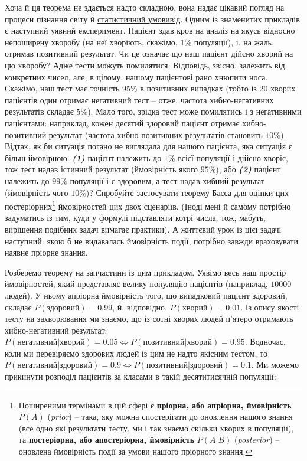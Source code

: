 \documentclass[
  11pt,
]{book}
\begin{document}
Хоча й ця теорема не здається надто складною, вона надає цікавий погляд на процеси пізнання світу й \hyperref[paradigms]{статистичний умовивід}. Одним із знаменитих прикладів є наступний уявний експеримент. Пацієнт здав кров на аналіз на якусь відносно непоширену хворобу (на неї хворіють, скажімо, \(1\%\) популяції), і, на жаль, отримав позитивний результат. Чи це означає що наш пацієнт дійсно хворий на цю хворобу? Адже тести можуть помилятися. Відповідь, звісно, залежить від конкретних чисел, але, в цілому, нашому пацієнтові рано хнюпити носа. Скажімо, наш тест має точність \(95\%\) в позитивних випадках (тобто із \(20\) хворих пацієнтів один отримає негативний тест -- отже, частота хибно-негативних результатів складає \(5\%\)). Мало того, зрідка тест може помилятись і з негативними пацієнтами: наприклад, кожен десятий здоровий пацієнт отримає хибно-позитивний результат (частота хибно-позитивних результатів становить \(10\%\)). Відтак, як би ситуація погано не виглядала для нашого пацієнта, яка ситуація є більш ймовірною: \textbf{\emph{(1)}} пацієнт належить до \(1\%\) всієї популяції і дійсно хворіє, тож тест надав істинний результат (ймовірність якого \(95\%\)), або \textbf{\emph{(2)}} пацієнт належить до \(99\%\) популяції і є здоровим, а тест надав хибний результат (ймовірність чого \(10\%\))? Спробуйте застосувати теорему Баєса для оцінки цих постеріорних\footnote{Поширеними термінами в цій сфері є \textbf{пріорна, або апріорна, ймовірність} \(P(A)\) (\emph{prior}) -- така, яку можна спостерігати до оновлення нашого знання (все одно які результати тесту, ми і так знаємо скільки хворих в популяції), та \textbf{постеріорна, або апостеріорна, ймовірність} \(P(A|B)\) (\emph{posterior}) -- оновлена ймовірність події за умови нашого пріорного знання.} ймовірностей цих двох сценаріїв. (Іноді мені й самому потрібно задуматись із тим, куди у формулі підставляти котрі числа, тож, мабуть, вирішення подібних задач вимагає практики). А життєвий урок із цієї задачі наступний: якою б не видавалась ймовірність події, потрібно завжди враховувати наявне пріорне знання.

Розберемо теорему на запчастини із цим прикладом. Уявімо весь наш простір ймовірностей, який представляє велику популяцію пацієнтів (наприклад, \(10000\) людей). У ньому апріорна ймовірність того, що випадковий пацієнт здоровий, складає \(P(\text{здоровий}) = 0.99\), й, відповідно, \(P(\text{хворий}) = 0.01\). Із опису якості тесту на захворювання ми знаємо, що із сотні хворих людей п'ятеро отримають хибно-негативний результат: \(P(\text{негативний|хворий}) = 0.05 \Leftrightarrow P(\text{позитивний|хворий}) = 0.95\). Водночас, коли ми перевіряємо здорових людей із цим не надто якісним тестом, то \(P(\text{негативний|здоровий}) = 0.9 \Leftrightarrow P(\text{позитивний|здоровий}) = 0.1\). Ми можемо прикинути розподіл пацієнтів за класами в такій десятитисячній популяції:
\end{document}
